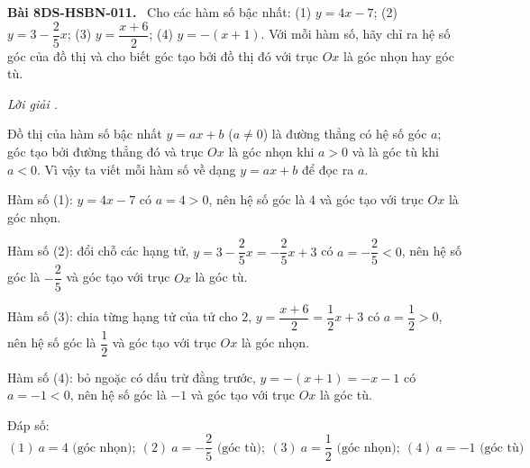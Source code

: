 \documentclass[12pt,a4paper]{article}
\newenvironment{problem}[1][]{\par\medskip\noindent\textbf{Bài #1.}\ }{\par}
\newenvironment{solution}[1][]{\par\noindent\textit{Lời giải #1.}\par}{\par}
\begin{document}
\begin{problem}[8DS-HSBN-011]
Cho các hàm số bậc nhất: (1) $y = 4x - 7$; (2) $y = 3 - \dfrac{2}{5}x$; (3) $y = \dfrac{x + 6}{2}$; (4) $y = -(x + 1)$. Với mỗi hàm số, hãy chỉ ra hệ số góc của đồ thị và cho biết góc tạo bởi đồ thị đó với trục $Ox$ là góc nhọn hay góc tù.

\begin{solution}
Đồ thị của hàm số bậc nhất $y = ax + b$ ($a \neq 0$) là đường thẳng có hệ số góc $a$; góc tạo bởi đường thẳng đó và trục $Ox$ là góc nhọn khi $a > 0$ và là góc tù khi $a < 0$. Vì vậy ta viết mỗi hàm số về dạng $y = ax + b$ để đọc ra $a$.

Hàm số (1): $y = 4x - 7$ có $a = 4 > 0$, nên hệ số góc là $4$ và góc tạo với trục $Ox$ là góc nhọn.

Hàm số (2): đổi chỗ các hạng tử, $y = 3 - \dfrac{2}{5}x = -\dfrac{2}{5}x + 3$ có $a = -\dfrac{2}{5} < 0$, nên hệ số góc là $-\dfrac{2}{5}$ và góc tạo với trục $Ox$ là góc tù.

Hàm số (3): chia từng hạng tử của tử cho $2$, $y = \dfrac{x + 6}{2} = \dfrac{1}{2}x + 3$ có $a = \dfrac{1}{2} > 0$, nên hệ số góc là $\dfrac{1}{2}$ và góc tạo với trục $Ox$ là góc nhọn.

Hàm số (4): bỏ ngoặc có dấu trừ đằng trước, $y = -(x + 1) = -x - 1$ có $a = -1 < 0$, nên hệ số góc là $-1$ và góc tạo với trục $Ox$ là góc tù.

Đáp số: $\boxed{(1)\ a = 4 \text{ (góc nhọn)};\ (2)\ a = -\dfrac{2}{5} \text{ (góc tù)};\ (3)\ a = \dfrac{1}{2} \text{ (góc nhọn)};\ (4)\ a = -1 \text{ (góc tù)}}$
\end{solution}
\end{problem}
\end{document}
